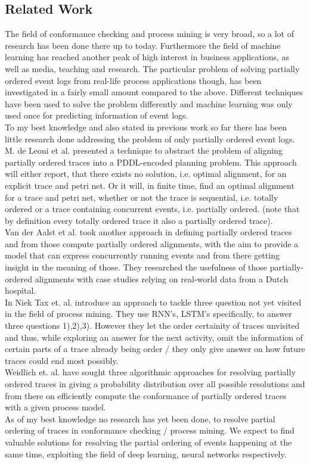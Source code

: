 \documentclass[
	a4paper,
	pagesize,
	pdftex,
	12pt,
	ngerman,
	fleqn,
	final,
	]{scrartcl}
\theoremstyle{plain}
\theoremstyle{definition}
\begin{document}
	\subsection{Related Work}
	The field of conformance checking and process mining is very broad, so a lot of research has been done there up to today. Furthermore the field of machine learning has reached another peak of high interest in business applications, as well as media, teaching and research. 
	The particular problem of solving partially ordered event logs from real-life process applications though, has been investigated in a fairly small amount compared to the above. 
	Different techniques have been used to solve the problem differently and machine learning was only used once for predicting information of event logs. \\
	To my best knowledge and also stated in previous work \cite{lu2014conformance} so far there has been little research done addressing the problem of only partially ordered event logs.\\
	M. de Leoni et al. presented a technique to abstract the problem of aligning partially ordered traces into a PDDL-encoded planning problem. This approach will either report, that there exists no solution, i.e. optimal alignment, for an explicit trace and petri net. Or it will, in finite time, find an optimal alignment for a trace and petri net, whether or not the trace is sequential, i.e. totally ordered or a trace containing concurrent events, i.e. partially ordered. (note that by definition every totally ordered trace it also a partially ordered trace).\cite{de2018aligning} \\
	Van der Aalst et al. took another approach in defining partially ordered traces and from those compute partially ordered alignments, with the aim to provide a model that can express concurrently running events and from there getting insight in the meaning of those. \cite{lu2014conformanceShort} They researched the usefulness of those partially-ordered alignments with case studies relying on real-world data from a Dutch hospital. \cite{lu2014conformance} \\
	In \cite{tax2017predictive} Niek Tax et. al. introduce an approach to tackle three question not yet visited in the field of process mining. They use RNN's, LSTM's specifically, to answer three questions 1),2),3). However they let the order certainity of traces unvisited and thus, while exploring an answer for the next activity, omit the information of certain parts of a trace already being order / they only give answer on how future traces could end most possibly. \\
	Weidlich et. al. have sought three algorithmic approaches for resolving partially ordered traces in giving a probability distribution over all possible resolutions and from there on efficiently compute the conformance of partially ordered traces with a given process model.\cite{self} \\
	As of my best knowledge no research has yet been done, to resolve partial ordering of traces in conformance checking / process mining. We expect to find valuable solutions for resolving the partial ordering of events happening at the same time, exploiting the field of deep learning, neural networks respectively. 
	
\end{document}
